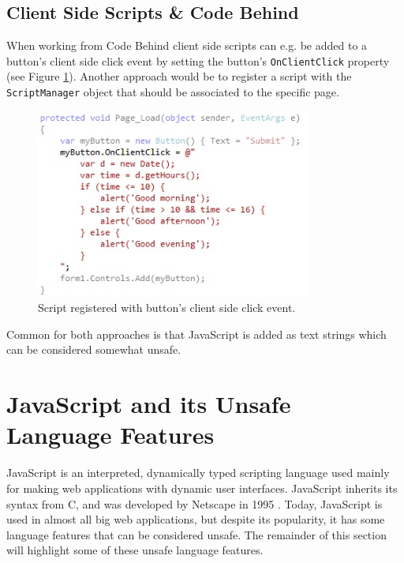 		\subsection{Client Side Scripts \& Code Behind} %
		\label{sub:client_side_scripts_code_behind}
			When working from Code Behind client side scripts can e.g. be added to a button's client side click event by setting the button's \texttt{OnClientClick} property (see Figure \ref{buttonScript}). Another approach would be to register a script with the \texttt{ScriptManager} object that should be associated to the specific page.

		\begin{figure}[H]
			\includegraphics[width=9cm]{resources/images/ButtonScript.png}
			\caption{Script registered with button's client side click event.}
			\label{buttonScript}
		\end{figure}

		Common for both approaches is that JavaScript is added as text strings which can be considered somewhat unsafe.





\section{JavaScript and its Unsafe Language Features} %
\label{sec:javascript_and_its_unsafe_language_feature}
	
	JavaScript is an interpreted, dynamically typed scripting language used mainly for making web applications with dynamic user interfaces. JavaScript inherits its syntax from C, and was developed by Netscape in 1995 \cite{bib:wiki_javascript}. Today, JavaScript is used in almost all big web applications, but despite its popularity, it has some language features that can be considered unsafe. The remainder of this section will highlight some of these unsafe language features.

